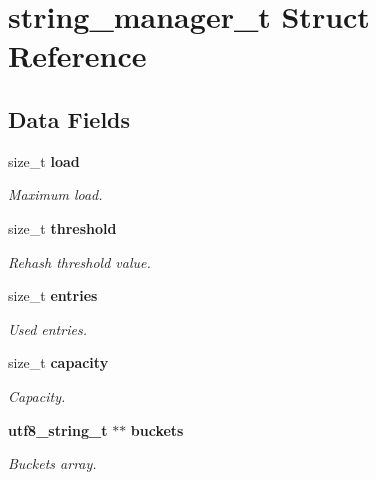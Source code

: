 \section{string\_\-manager\_\-t Struct Reference}
\label{structstring__manager__t}
\subsection*{Data Fields}
\begin{DoxyCompactItemize}
\item 
size\_\-t {\bf load}\label{structstring__manager__t_a8c7cb07f7bc8f78680d4346fab7827b1}

\begin{DoxyCompactList}\small\item\em Maximum load. \item\end{DoxyCompactList}\item 
size\_\-t {\bf threshold}\label{structstring__manager__t_a4ced5970c308a5077ce26f85cdb33c05}

\begin{DoxyCompactList}\small\item\em Rehash threshold value. \item\end{DoxyCompactList}\item 
size\_\-t {\bf entries}\label{structstring__manager__t_a2ecc0794b542762f20b749220cfaa565}

\begin{DoxyCompactList}\small\item\em Used entries. \item\end{DoxyCompactList}\item 
size\_\-t {\bf capacity}\label{structstring__manager__t_ad04321409655e370735564e51c270933}

\begin{DoxyCompactList}\small\item\em Capacity. \item\end{DoxyCompactList}\item 
{\bf utf8\_\-string\_\-t} $\ast$$\ast$ {\bf buckets}\label{structstring__manager__t_aa7820de9549e9f6120ac64c017360b3a}

\begin{DoxyCompactList}\small\item\em Buckets array. \item\end{DoxyCompactList}\end{DoxyCompactItemize}


